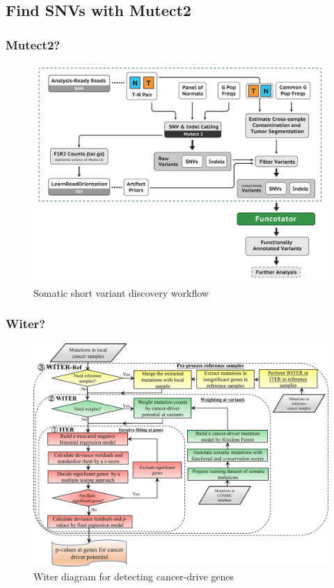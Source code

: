 \documentclass{beamer}
\begin{document}
    \subsection{Find SNVs with Mutect2}
    \begin{frame}
        \frametitle{Mutect2?}

        \begin{figure}
            \includegraphics[width=0.6 \linewidth]{figures/Workflow/somatic_short_variants.png}
            \caption{Somatic short variant discovery workflow \protect\cite{gatk1, gatk2}}
        \end{figure}
    \end{frame}

    \begin{frame}
        \frametitle{Witer?}

        \begin{figure}
            \includegraphics[width=0.6 \linewidth]{figures/Workflow/witer.jpg}
            \caption{Witer diagram for detecting cancer-drive genes \protect\cite{witer1}}
        \end{figure}
    \end{frame}
\end{document}
